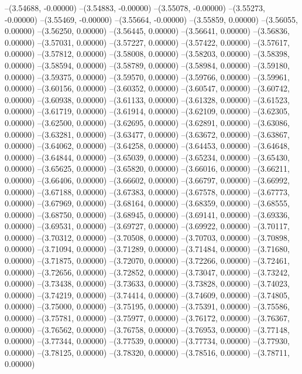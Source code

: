 --(3.54688, -0.00000)
--(3.54883, -0.00000)
--(3.55078, -0.00000)
--(3.55273, -0.00000)
--(3.55469, -0.00000)
--(3.55664, -0.00000)
--(3.55859, 0.00000)
--(3.56055, 0.00000)
--(3.56250, 0.00000)
--(3.56445, 0.00000)
--(3.56641, 0.00000)
--(3.56836, 0.00000)
--(3.57031, 0.00000)
--(3.57227, 0.00000)
--(3.57422, 0.00000)
--(3.57617, 0.00000)
--(3.57812, 0.00000)
--(3.58008, 0.00000)
--(3.58203, 0.00000)
--(3.58398, 0.00000)
--(3.58594, 0.00000)
--(3.58789, 0.00000)
--(3.58984, 0.00000)
--(3.59180, 0.00000)
--(3.59375, 0.00000)
--(3.59570, 0.00000)
--(3.59766, 0.00000)
--(3.59961, 0.00000)
--(3.60156, 0.00000)
--(3.60352, 0.00000)
--(3.60547, 0.00000)
--(3.60742, 0.00000)
--(3.60938, 0.00000)
--(3.61133, 0.00000)
--(3.61328, 0.00000)
--(3.61523, 0.00000)
--(3.61719, 0.00000)
--(3.61914, 0.00000)
--(3.62109, 0.00000)
--(3.62305, 0.00000)
--(3.62500, 0.00000)
--(3.62695, 0.00000)
--(3.62891, 0.00000)
--(3.63086, 0.00000)
--(3.63281, 0.00000)
--(3.63477, 0.00000)
--(3.63672, 0.00000)
--(3.63867, 0.00000)
--(3.64062, 0.00000)
--(3.64258, 0.00000)
--(3.64453, 0.00000)
--(3.64648, 0.00000)
--(3.64844, 0.00000)
--(3.65039, 0.00000)
--(3.65234, 0.00000)
--(3.65430, 0.00000)
--(3.65625, 0.00000)
--(3.65820, 0.00000)
--(3.66016, 0.00000)
--(3.66211, 0.00000)
--(3.66406, 0.00000)
--(3.66602, 0.00000)
--(3.66797, 0.00000)
--(3.66992, 0.00000)
--(3.67188, 0.00000)
--(3.67383, 0.00000)
--(3.67578, 0.00000)
--(3.67773, 0.00000)
--(3.67969, 0.00000)
--(3.68164, 0.00000)
--(3.68359, 0.00000)
--(3.68555, 0.00000)
--(3.68750, 0.00000)
--(3.68945, 0.00000)
--(3.69141, 0.00000)
--(3.69336, 0.00000)
--(3.69531, 0.00000)
--(3.69727, 0.00000)
--(3.69922, 0.00000)
--(3.70117, 0.00000)
--(3.70312, 0.00000)
--(3.70508, 0.00000)
--(3.70703, 0.00000)
--(3.70898, 0.00000)
--(3.71094, 0.00000)
--(3.71289, 0.00000)
--(3.71484, 0.00000)
--(3.71680, 0.00000)
--(3.71875, 0.00000)
--(3.72070, 0.00000)
--(3.72266, 0.00000)
--(3.72461, 0.00000)
--(3.72656, 0.00000)
--(3.72852, 0.00000)
--(3.73047, 0.00000)
--(3.73242, 0.00000)
--(3.73438, 0.00000)
--(3.73633, 0.00000)
--(3.73828, 0.00000)
--(3.74023, 0.00000)
--(3.74219, 0.00000)
--(3.74414, 0.00000)
--(3.74609, 0.00000)
--(3.74805, 0.00000)
--(3.75000, 0.00000)
--(3.75195, 0.00000)
--(3.75391, 0.00000)
--(3.75586, 0.00000)
--(3.75781, 0.00000)
--(3.75977, 0.00000)
--(3.76172, 0.00000)
--(3.76367, 0.00000)
--(3.76562, 0.00000)
--(3.76758, 0.00000)
--(3.76953, 0.00000)
--(3.77148, 0.00000)
--(3.77344, 0.00000)
--(3.77539, 0.00000)
--(3.77734, 0.00000)
--(3.77930, 0.00000)
--(3.78125, 0.00000)
--(3.78320, 0.00000)
--(3.78516, 0.00000)
--(3.78711, 0.00000)
